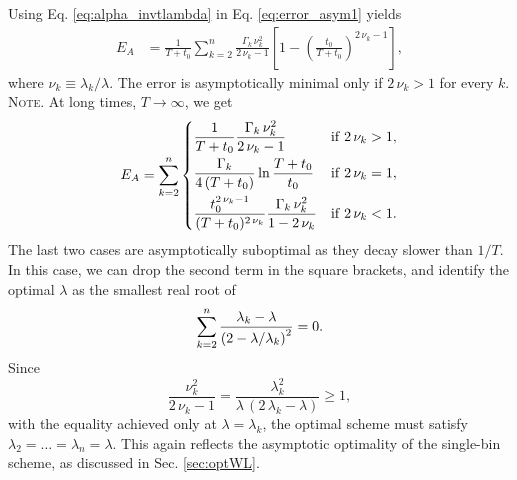\documentclass[reprint, floatfix]{revtex4-1}
\newcommand{\note}[1]{{\color{DarkGreen}\footnotesize \textsc{Note.} #1}}
\newcommand{\Err}{E}
\begin{document}
Using Eq. \eqref{eq:alpha_invtlambda}
in Eq. \eqref{eq:error_asym1} yields
%
\begin{align}
\Err_A
&=
\frac{    1    }
     { T + t_0 }
\sum_{k = 2}^n
  \frac{ \Gamma_k \, \nu_k^2 }
       {    2 \, \nu_k - 1   }
\left[
  1 - \left(
        \frac {     t_0 }
              { T + t_0 }
      \right)^{ 2 \, \nu_k - 1 }
\right],
\label{eq:error_asym_invt}
\end{align}
%
where $\nu_k \equiv \lambda_k / \lambda$.
%
The error is asymptotically minimal
only if $2\,\nu_k > 1$ for every $k$.
\note{At long times, $T \to \infty$, we get
$$
\begin{aligned}
  \Err_A
  =
  \sum_{k = 2}^n
  \begin{dcases}
    \frac{    1    }
         { T + t_0 }
    \frac{ \Gamma_k \, \nu_k^2 }
         {   2 \, \nu_k - 1    }
    &
    \mathrm{if \;} 2 \, \nu_k > 1,
    \\%
    \frac{    \Gamma_k    }
         { 4 \, (T + t_0) }
    \ln \frac{ T + t_0 }
             {   t_0   }
    &
    \mathrm{if \;} 2 \, \nu_k = 1,
    \\
    \frac{  t_0^{ 2 \, \nu_k  - 1}  }
         { (T + t_0)^{ 2 \, \nu_k } }
    \frac{ \Gamma_k \, \nu_k^2 }
         {   1 - 2 \, \nu_k    }
    &
    \mathrm{if \;} 2 \, \nu_k < 1.
  \end{dcases}
\end{aligned}
$$
%
The last two cases
are asymptotically suboptimal
as they decay slower than $1/T$.
}
%
In this case,
we can drop the second term
in the square brackets,
and identify the optimal $\lambda$ as
the smallest real root of
%
\begin{equation}
  \sum_{k = 2}^n
    \frac { \lambda_k - \lambda }
          { \left(2 - \lambda/ \lambda_k \right)^2 }
  = 0.
\notag
\end{equation}
%
Since
$$
\frac{ \nu_k^2        }
     { 2 \, \nu_k - 1 }
=
\frac{ \lambda_k^2 }
     { \lambda \, (2 \, \lambda_k - \lambda) }
\ge 1,
$$
with the equality achieved only at $\lambda = \lambda_k$,
the optimal scheme must satisfy
$\lambda_2 = \dots = \lambda_n = \lambda$.
%
%
%
This again reflects the asymptotic optimality
of the single-bin scheme, as discussed in
Sec. \ref{sec:optWL}.
\end{document}
